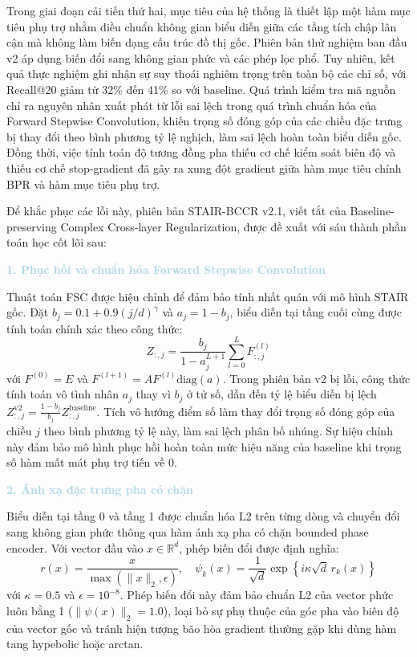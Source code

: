 Trong giai đoạn cải tiến thứ hai, mục tiêu của hệ thống là thiết lập một hàm mục tiêu phụ trợ nhằm điều chuẩn không gian biểu diễn giữa các tầng tích chập lân cận mà không làm biến dạng cấu trúc đồ thị gốc. Phiên bản thử nghiệm ban đầu v2 áp dụng biến đổi sang không gian phức và các phép lọc phổ. Tuy nhiên, kết quả thực nghiệm ghi nhận sự suy thoái nghiêm trọng trên toàn bộ các chỉ số, với Recall@20 giảm từ 32\% đến 41\% so với baseline. Quá trình kiểm tra mã nguồn chỉ ra nguyên nhân xuất phát từ lỗi sai lệch trong quá trình chuẩn hóa của Forward Stepwise Convolution, khiến trọng số đóng góp của các chiều đặc trưng bị thay đổi theo bình phương tỷ lệ nghịch, làm sai lệch hoàn toàn biểu diễn gốc. Đồng thời, việc tính toán độ tương đồng pha thiếu cơ chế kiểm soát biên độ và thiếu cơ chế stop-gradient đã gây ra xung đột gradient giữa hàm mục tiêu chính BPR và hàm mục tiêu phụ trợ.

Để khắc phục các lỗi này, phiên bản STAIR-BCCR v2.1, viết tắt của Baseline-preserving Complex Cross-layer Regularization, được đề xuất với sáu thành phần toán học cốt lõi sau:

\noindent\textcolor{lightblue}{\textbf{1. Phục hồi và chuẩn hóa Forward Stepwise Convolution}}

Thuật toán FSC được hiệu chỉnh để đảm bảo tính nhất quán với mô hình STAIR gốc. Đặt $b_j = 0.1 + 0.9(j/d)^\gamma$ và $a_j = 1 - b_j$, biểu diễn tại tầng cuối cùng được tính toán chính xác theo công thức:
\begin{equation}
Z_{:,j} = \frac{b_j}{1 - a_j^{L+1}} \sum_{l=0}^{L} F^{(l)}_{:,j}
\end{equation}
với $F^{(0)} = E$ và $F^{(l+1)} = A F^{(l)} \text{diag}(a)$. Trong phiên bản v2 bị lỗi, công thức tính toán vô tình nhân $a_j$ thay vì $b_j$ ở tử số, dẫn đến tỷ lệ biểu diễn bị lệch $Z_{:,j}^{\text{v2}} = \frac{1-b_j}{b_j} Z_{:,j}^{\text{baseline}}$. Tích vô hướng điểm số làm thay đổi trọng số đóng góp của chiều $j$ theo bình phương tỷ lệ này, làm sai lệch phân bố nhúng. Sự hiệu chỉnh này đảm bảo mô hình phục hồi hoàn toàn mức hiệu năng của baseline khi trọng số hàm mất mát phụ trợ tiến về 0.

\noindent\textcolor{lightblue}{\textbf{2. Ánh xạ đặc trưng pha có chặn}}

Biểu diễn tại tầng 0 và tầng 1 được chuẩn hóa L2 trên từng dòng và chuyển đổi sang không gian phức thông qua hàm ánh xạ pha có chặn bounded phase encoder. Với vector đầu vào $x \in \mathbb{R}^d$, phép biến đổi được định nghĩa:
\begin{equation}
r(x) = \frac{x}{\max(\|x\|_2, \epsilon)}, \quad \psi_k(x) = \frac{1}{\sqrt{d}} \exp\left\{i \kappa \sqrt{d} \, r_k(x)\right\}
\end{equation}
với $\kappa = 0.5$ và $\epsilon = 10^{-8}$. Phép biến đổi này đảm bảo chuẩn L2 của vector phức luôn bằng 1 ($\|\psi(x)\|_2 = 1.0$), loại bỏ sự phụ thuộc của góc pha vào biên độ của vector gốc và tránh hiện tượng bão hòa gradient thường gặp khi dùng hàm tang hypebolic hoặc arctan.

